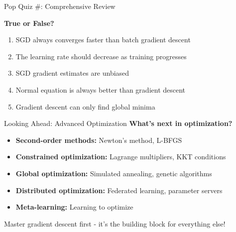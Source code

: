 \documentclass[usenames,dvipsnames]{beamer}
\begin{document}
  \begin{frame}{Pop Quiz \#\thepopquiz: Comprehensive Review}
    \begin{popquizbox}{\thepopquiz}
    \textbf{True or False?}
    \begin{enumerate}
        \item SGD always converges faster than batch gradient descent
        \item The learning rate should decrease as training progresses
        \item SGD gradient estimates are unbiased
        \item Normal equation is always better than gradient descent
        \item Gradient descent can only find global minima
    \end{enumerate}
    \end{popquizbox}
  \end{frame}

  \begin{frame}{Looking Ahead: Advanced Optimization}
    \textbf{What's next in optimization?}
    
    \begin{itemize}[<+->]
        \item \textbf{Second-order methods:} Newton's method, L-BFGS
        \item \textbf{Constrained optimization:} Lagrange multipliers, KKT conditions  
        \item \textbf{Global optimization:} Simulated annealing, genetic algorithms
        \item \textbf{Distributed optimization:} Federated learning, parameter servers
        \item \textbf{Meta-learning:} Learning to optimize
    \end{itemize}
    
    \pause
    \begin{keypointsbox}
    Master gradient descent first - it's the building block for everything else!
    \end{keypointsbox}
  \end{frame}
\end{document}

